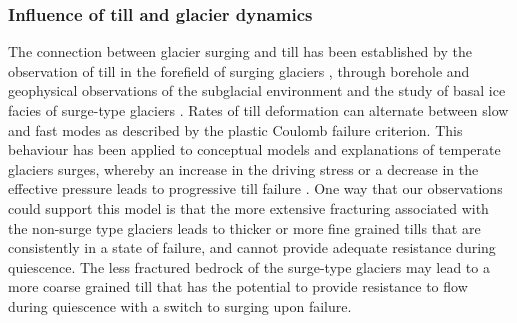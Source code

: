 \documentclass[draft,linenumbers]{agujournal}
\begin{document}
\subsubsection{Influence of till and glacier dynamics}

The connection between glacier surging and till has been established by the observation of till in the forefield of surging glaciers \citep[e.g.][]{Evans1999,Christoffersen2005,Sobota2016}, through borehole and geophysical observations of the subglacial environment \citep[e.g.][]{Blake1994,Porter1997,Harrison2003,Truffer2000} and the study of basal ice facies of surge-type glaciers \citep{Sharp1994}. Rates of till deformation can alternate between slow and fast modes as described by the plastic Coulomb failure criterion. This behaviour has been applied to conceptual models and explanations of temperate glaciers surges, whereby an increase in the driving stress or a decrease in the effective pressure leads to progressive till failure \citep[e.g.][]{Boulton1979,Clarke1984,Truffer2001,Nolan2003}.
One way that our observations could support this model is that the more extensive fracturing associated with the non-surge type glaciers leads to thicker or more fine grained tills \citep{Crompton2016} that are consistently in a state of failure, and cannot provide adequate resistance during quiescence. The less fractured bedrock of the surge-type glaciers may lead to a more coarse grained till that has the potential to provide resistance to flow during quiescence with a switch to surging upon failure. 
 
\end{document}
